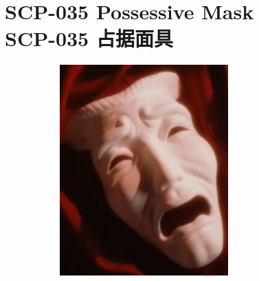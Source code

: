 \chapter[SCP-035 占据面具]{
    SCP-035 Possessive Mask\\
    SCP-035 占据面具
}

\label{chap:SCP-035}

\begin{figure}[H]
    \centering
    \begin{subfigure}[b]{0.4\textwidth}
        \centering
        \includegraphics[width=\linewidth]{images/SCP.035.0.png}
    \end{subfigure}
    \begin{subfigure}[b]{0.4\textwidth}
        \centering

\end{subfigure}
\end{figure}
